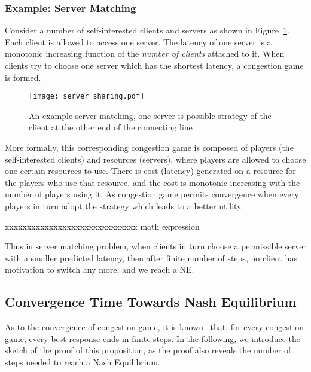 \subsubsection*{Example: Server Matching}

Consider a number of self-interested clients and servers as shown in Figure~\ref{server_sharing}.
Each client is allowed to access one server.
The latency of one server is a monotonic increasing function of the \textit{number of clients} attached to it.
When clients try to choose one server which has the shortest latency, a congestion game is formed.
\begin{figure}[h!]
  \centering
  \texttt{[image: server\_sharing.pdf]}
  \caption{An example server matching, one server is possible strategy of the client at the other end of the connecting line}
\label{server_sharing}
\end{figure}

More formally, this corresponding congestion game is composed of players (the self-interested clients) and resources (servers), where players are allowed to choose one certain resources to use. 
There is cost (latency) generated on a resource for the players who use that resource, and the cost is monotonic increasing with the number of players using it. 
As congestion game permits convergence when every players in turn adopt the strategy which leads to a better utility.

xxxxxxxxxxxxxxxxxxxxxxxxxxxxxx   math expression

Thus in server matching problem, when clients in turn choose a permissible server with a smaller predicted latency, then after finite number of steps, no client has motivation to switch any more, and we reach a NE.








\subsection{Convergence Time Towards Nash Equilibrium}
As to the convergence of congestion game, it is known~\cite{Voecking06congestiongames} that, for every congestion game, every best response ends in finite steps.
In the following, we introduce the sketch of the proof of this proposition, as the proof also reveals the number of steps needed to reach a Nash Equilibrium.

